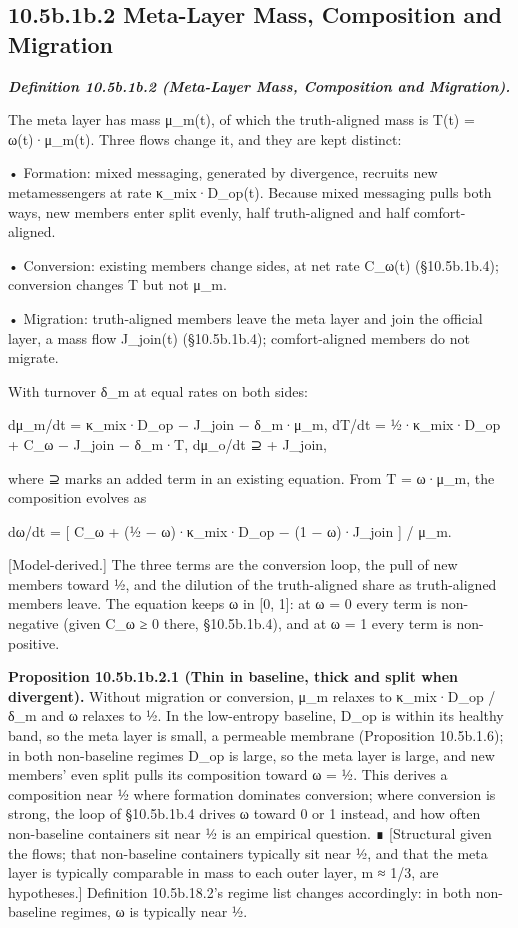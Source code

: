 \documentclass[
]{article}
\begin{document}
\hypertarget{b.1b.2-meta-layer-mass-composition-and-migration}{%
\subsection{10.5b.1b.2 Meta-Layer Mass, Composition and
Migration}\label{b.1b.2-meta-layer-mass-composition-and-migration}}

\emph{\textbf{Definition 10.5b.1b.2 (Meta-Layer Mass, Composition and
Migration).}}

The meta layer has mass μ\_m(t), of which the truth-aligned mass is T(t)
= ω(t)·μ\_m(t). Three flows change it, and they are kept distinct:

• Formation: mixed messaging, generated by divergence, recruits new
metamessengers at rate κ\_mix·D\_op(t). Because mixed messaging pulls
both ways, new members enter split evenly, half truth-aligned and half
comfort-aligned.

• Conversion: existing members change sides, at net rate C\_ω(t)
(§10.5b.1b.4); conversion changes T but not μ\_m.

• Migration: truth-aligned members leave the meta layer and join the
official layer, a mass flow J\_join(t) (§10.5b.1b.4); comfort-aligned
members do not migrate.

With turnover δ\_m at equal rates on both sides:

dμ\_m/dt = κ\_mix·D\_op − J\_join − δ\_m·μ\_m, dT/dt = ½·κ\_mix·D\_op +
C\_ω − J\_join − δ\_m·T, dμ\_o/dt ⊇ + J\_join,

where ⊇ marks an added term in an existing equation. From T = ω·μ\_m,
the composition evolves as

dω/dt = {[} C\_ω + (½ − ω)·κ\_mix·D\_op − (1 − ω)·J\_join {]} / μ\_m.

{[}Model-derived.{]} The three terms are the conversion loop, the pull
of new members toward ½, and the dilution of the truth-aligned share as
truth-aligned members leave. The equation keeps ω in {[}0, 1{]}: at ω =
0 every term is non-negative (given C\_ω ≥ 0 there, §10.5b.1b.4), and at
ω = 1 every term is non-positive.

\textbf{Proposition 10.5b.1b.2.1 (Thin in baseline, thick and split when
divergent).} Without migration or conversion, μ\_m relaxes to
κ\_mix·D\_op / δ\_m and ω relaxes to ½. In the low-entropy baseline,
D\_op is within its healthy band, so the meta layer is small, a
permeable membrane (Proposition 10.5b.1.6); in both non-baseline regimes
D\_op is large, so the meta layer is large, and new members' even split
pulls its composition toward ω = ½. This derives a composition near ½
where formation dominates conversion; where conversion is strong, the
loop of §10.5b.1b.4 drives ω toward 0 or 1 instead, and how often
non-baseline containers sit near ½ is an empirical question. ∎
{[}Structural given the flows; that non-baseline containers typically
sit near ½, and that the meta layer is typically comparable in mass to
each outer layer, m ≈ 1/3, are hypotheses.{]} Definition 10.5b.18.2's
regime list changes accordingly: in both non-baseline regimes, ω is
typically near ½.
\end{document}
